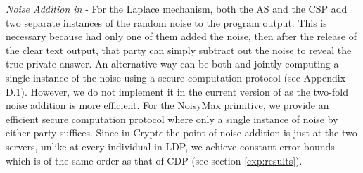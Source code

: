 \textit{Noise Addition in \system} - For the Laplace mechanism, both the \textsf{AS} and the \textsf{CSP} add two separate instances of the random noise to the program output. This is necessary because had only one of them added the noise, then after the release of the clear text output, that party can simply subtract out the noise to reveal the true private answer. An alternative way can be both \AS and \CSP jointly computing a single instance of the noise using a secure computation protocol (see Appendix D.1). However, we do not implement it in the current version of \system as the two-fold noise addition is more efficient. For the NoisyMax primitive, we provide an efficient secure computation protocol where only a single instance of noise by either party suffices. 
Since in Crypt$\epsilon$ the point of noise addition is just at the two servers, unlike at every individual in \textsf{LDP}, we achieve constant error bounds which is of the same order as that of \textsf{CDP} (see section \ref{exp:results}). 
